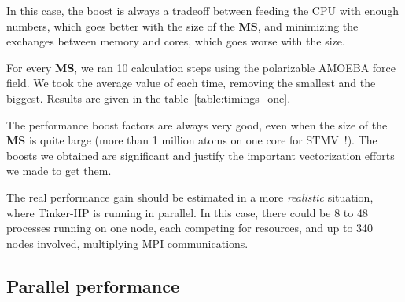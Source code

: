 \documentclass[9pt,comparison]{livecoms}
\begin{document}
In this case, the boost is always a tradeoff between feeding the CPU with enough numbers, which goes better with the size of the \textbf{MS}, and minimizing the exchanges between memory and cores, which goes worse with the size. 

For every \textbf{MS}, we ran 10 calculation steps using the polarizable AMOEBA force field. We took the average value of each time, removing the smallest and the biggest. Results are given in the table~\ref{table:timings_one}.

The performance boost factors are always very good, even when the size of the \textbf{MS} is quite large (more than 1 million atoms on one core for STMV~!). The boosts we obtained are significant and justify the important vectorization efforts we made to get them.

The real performance gain should be estimated in a more \emph{realistic} situation, where Tinker-HP is running in parallel. In this case, there could be 8 to 48 processes running on one node, each competing for resources, and up to 340 nodes involved, multiplying MPI communications.
\subsection{Parallel performance}
\end{document}
